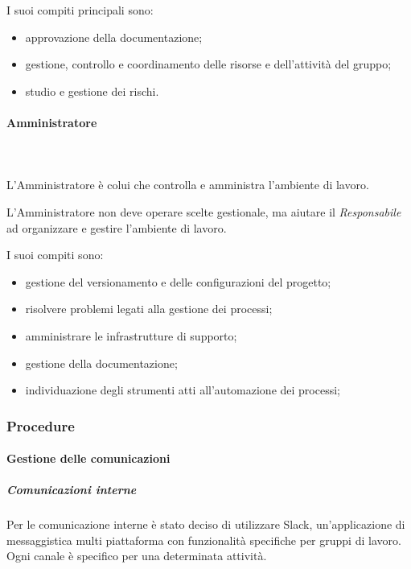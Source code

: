    			I suoi compiti principali sono:
   			\begin{itemize}
   				\item approvazione della documentazione;
   				\item gestione, controllo e coordinamento delle risorse e dell'attività del gruppo;
   				\item studio e gestione dei rischi.
   			\end{itemize}
   			\paragraph{Amministratore} \mbox{}\\ \mbox{}\\
   			L'Amministratore è colui che controlla e amministra l'ambiente di lavoro.
   			
   			L'Amministratore non deve operare scelte gestionale, ma aiutare il \textit{Responsabile} ad organizzare e gestire l'ambiente di lavoro.
   			
   			I suoi compiti sono:
   			\begin{itemize}
   				\item gestione del versionamento e delle configurazioni del progetto;
   				\item risolvere problemi legati alla gestione dei processi;
   				\item amministrare le infrastrutture di supporto;
   				\item gestione della documentazione;
   				\item individuazione degli strumenti atti all'automazione dei processi;
   			\end{itemize}
   		\subsubsection{Procedure}
   			\paragraph{Gestione delle comunicazioni} 
   				\subparagraph{Comunicazioni interne}
   					Per le comunicazione interne è stato deciso di utilizzare  Slack\glos, un'applicazione di messaggistica multi piattaforma con funzionalità specifiche per gruppi di lavoro. Ogni canale è specifico per una determinata attività.
   				
